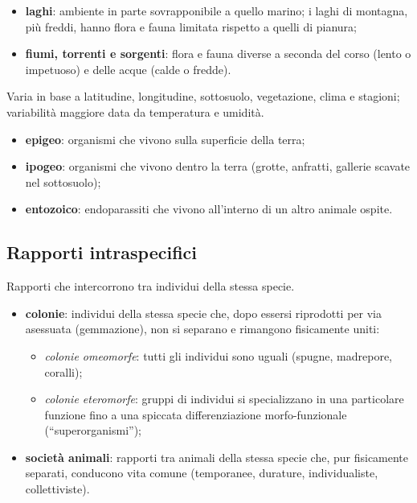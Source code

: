 \begin{itemize}
  \item \textbf{laghi}: ambiente in parte sovrapponibile a quello marino; i laghi di montagna, più freddi, hanno flora e fauna limitata rispetto a quelli di pianura;
  \item \textbf{fiumi, torrenti e sorgenti}: flora e fauna diverse a seconda del corso (lento o impetuoso) e delle acque (calde o fredde).
\end{itemize}

Varia in base a latitudine, longitudine, sottosuolo, vegetazione, clima e stagioni; variabilità maggiore data da temperatura e umidità.
\begin{itemize}
  \item \textbf{epigeo}: organismi che vivono sulla superficie della terra;
  \item \textbf{ipogeo}: organismi che vivono dentro la terra (grotte, anfratti, gallerie scavate nel sottosuolo);
  \item \textbf{entozoico}: endoparassiti che vivono all'interno di un altro animale ospite.
\end{itemize}

\subsection{Rapporti intraspecifici}

Rapporti che intercorrono tra individui della stessa specie.
\begin{itemize}
  \item \textbf{colonie}: individui della stessa specie che, dopo essersi riprodotti per via asessuata (gemmazione), non si separano e rimangono fisicamente uniti:
    \begin{itemize}
      \item \textit{colonie omeomorfe}: tutti gli individui sono uguali (spugne, madrepore, coralli);
      \item \textit{colonie eteromorfe}: gruppi di individui si specializzano in una particolare funzione fino a una spiccata differenziazione morfo-funzionale (``superorganismi'');
    \end{itemize}
  \item \textbf{società animali}: rapporti tra animali della stessa specie che, pur fisicamente separati, conducono vita comune (temporanee, durature, individualiste, collettiviste).
\end{itemize}

